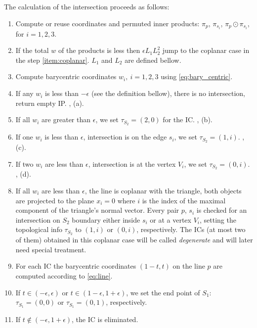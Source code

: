 The calculation of the intersection proceeds as follows:
\begin{enumerate}
    \item Compute or reuse \plucker coordinates and permuted inner products: $\pi_p$, $\pi_{s_i}$, $\pi_p \odot \pi_{s_i}$, for $i=1,2,3$.
    \item \label{item:zero_total} If the total $w$ of the products is less then $\epsilon L_1 L_2^2$ jump to the coplanar case in the step \ref{item:coplanar}.
          $L_1$ and $L_2$ are defined bellow.
    \item Compute barycentric coordinates $w_i,\ i=1,2,3$ using \eqref{eq:bary_centric}.
    \item If any $w_i$ is less than $-\epsilon$ (see the definition bellow), there is no intersection, return empty IP. , (a).          
    \item If all $w_i$ are greater than $\epsilon$, we set $\tau_{S_2} = (2, 0)$ for the IC. , (b).
    \item If one $w_i$ is less than $\epsilon$, intersection is on the edge $s_i$, we set $\tau_{S_2} =(1,i)$. , (c).
    \item If two $w_i$ are less than $\epsilon$, intersection is at the vertex $V_i$, we set $\tau_{S_2}=(0,i)$. , (d).
    \item \label{item:coplanar} If all $w_i$ are less than $\epsilon$, the line is coplanar with the triangle, both objects are 
        projected to the plane $x_i=0$ where $i$ is the index of the maximal component of the triangle's normal vector.
        Every pair $p$, $s_i$ is checked for an intersection on $S_2$ boundary either inside $s_i$ or at a vertex $V_i$, 
        setting the topological info $\tau_{S_2}$ to 
        $(1, i)$ or $(0, i)$, respectively. The ICs (at most two of them) obtained in this coplanar case will be called 
        \emph{degenerate} and will later need special treatment.
    \item For each IC the barycentric coordinates $(1-t, t)$ on the line $p$ are computed according to \eqref{eq:line}. 
    \item If $t\in (-\epsilon, \epsilon)$ or $t\in (1-\epsilon, 1+\epsilon)$,
        we set the end point of $S_1$: $\tau_{S_1} = (0,0)$ or $\tau_{S_1} = (0,1)$, respectively.
    \item If $t\notin (-\epsilon, 1+\epsilon)$, the IC is eliminated.
\end{enumerate}

